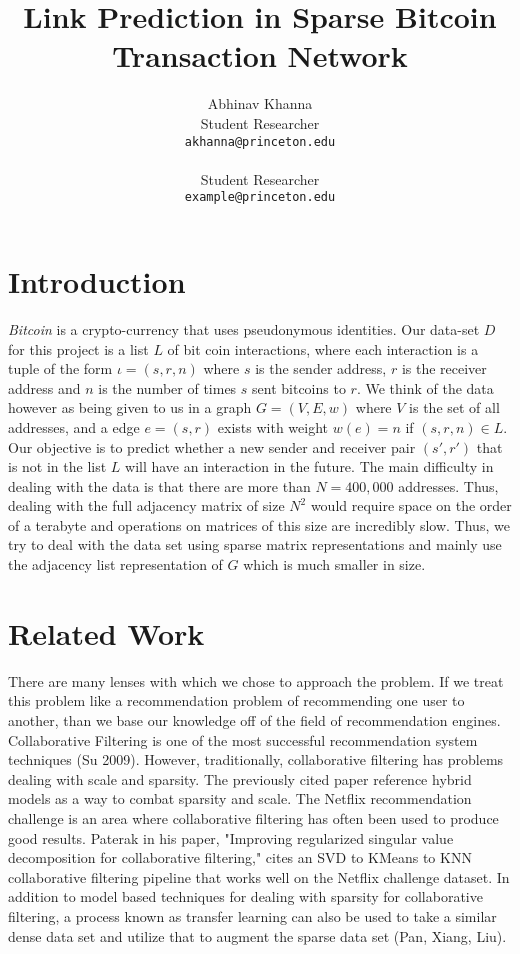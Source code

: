\documentclass{article} %
\title{Link Prediction in Sparse Bitcoin Transaction Network}
\author{
Abhinav Khanna\\
Student Researcher\\
\texttt{akhanna@princeton.edu} \\
\And
 \\
Student Researcher \\
\texttt{example@princeton.edu} \\
}
\begin{document}
\maketitle

\begin{abstract}
\end{abstract}

\section{Introduction}
{\em Bitcoin} is a crypto-currency that uses pseudonymous identities.
    Our data-set $D$ for this project is a list $L$ of bit coin interactions,
    where each interaction is a tuple of the form $\iota = (s, r, n)$
    where $s$ is the sender address, $r$ is the receiver address and $n$ is the number of times $s$
    sent bitcoins to $r$.
    We think of the data however as being given to us in a graph $G = (V, E, w)$
    where $V$ is the set of all addresses,
    and a edge $e = (s, r)$ exists with weight $w(e) = n$ if $(s, r, n) \in L$.
    Our objective is to predict whether a new sender and receiver pair $(s', r')$ that
    is not in the list $L$ will have an interaction in the future.
    The main difficulty in dealing with the data is that there are more than $N = 400,000$ addresses.
    Thus, dealing with the full adjacency matrix of size $N^2$ would require space on the
    order of a terabyte and operations on matrices of this size are incredibly slow.
    Thus, we try to deal with the data set using sparse matrix representations and mainly
    use the adjacency list representation of $G$ which is much smaller in size.

\section{Related Work}
There are many lenses with which we chose to approach the problem. If we treat this problem like a recommendation problem of recommending one user to another, than we base our knowledge off of the field of recommendation engines. Collaborative Filtering is one of the most successful recommendation system techniques (Su 2009). However, traditionally, collaborative filtering has problems dealing with scale and sparsity. The previously cited paper reference hybrid models as a way to combat sparsity and scale. The Netflix recommendation challenge is an area where collaborative filtering has often been used to produce good results. Paterak in his paper, "Improving regularized singular value decomposition for collaborative filtering," cites an SVD to KMeans to KNN collaborative filtering pipeline that works well on the Netflix challenge dataset. In addition to model based techniques for dealing with sparsity for collaborative filtering, a process known as transfer learning can also be used to take a similar dense data set and utilize that to augment the sparse data set (Pan, Xiang, Liu).
\end{document}
